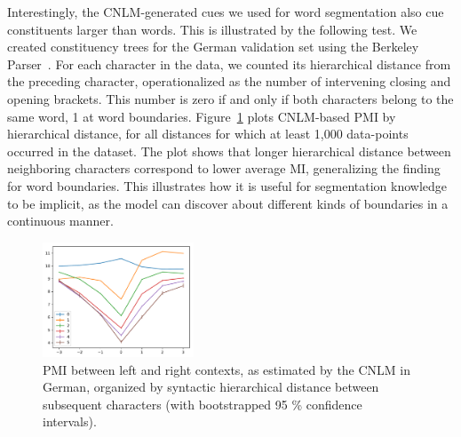 Interestingly, the CNLM-generated cues we used for word segmentation
also cue constituents larger than words. This is illustrated by the
following test. We created constituency trees for the German
validation set using the Berkeley Parser~\cite{petrov2007improved}.
For each character in the data, we counted its hierarchical distance
from the preceding character, operationalized as the number of
intervening closing and opening brackets.  This number is zero if and
only if both characters belong to the same word, 1 at word
boundaries. Figure~\ref{fig:syntax-depth} plots CNLM-based PMI by
hierarchical distance, for all distances for which at least 1,000
data-points occurred in the dataset.  The plot shows that longer
hierarchical distance between neighboring characters correspond to
lower average MI, generalizing the finding for word boundaries.  This
illustrates how it is useful for segmentation knowledge to be
implicit, as the model can discover about different kinds of
boundaries in a continuous manner.

\begin{figure}
  \center
\includegraphics[width=0.4\textwidth]{figures/segmentation-profile-pmis-german-all-heights-ci.pdf}
\caption{PMI between left and right contexts, as estimated by the CNLM in German, organized by syntactic hierarchical distance between subsequent characters (with bootstrapped 95 \% confidence intervals).}\label{fig:syntax-depth}
\end{figure}





